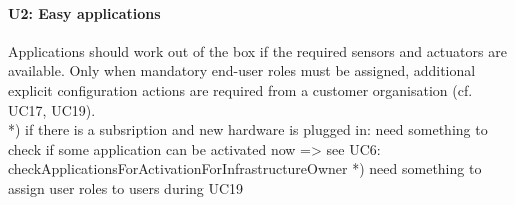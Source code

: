 

    \paragraph{U2: Easy applications}
        Applications should work out of the box if the required sensors and
        actuators are available. Only when mandatory end-user roles must be
        assigned, additional explicit configuration actions are required
        from a customer organisation (cf. UC17, UC19). \\
        *) if there is a subsription and new hardware is plugged in: need something to check
           if some application can be activated now => see UC6: checkApplicationsForActivationForInfrastructureOwner
        *) need something to assign user roles to users during UC19

